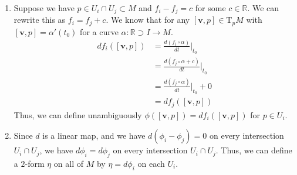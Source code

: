 \documentclass[12 pt, letterpaper]{hmcpset}
\begin{document}
\begin{solution}
	\begin{enumerate}
		\item
			Suppose we have $p \in U_{i} \cap U_{j} \subset M$ and $f_{i} - f_{j} = c$ for some $c \in \mathbb{R}$. We can rewrite this as $f_{i} = f_{j} + c$. We know that for any $[\mathbf{v}, p] \in \mathrm{T}_{p} M$ with $[\mathbf{v}, p] = \alpha'(t_{0})$ for a curve $\alpha : \mathbb{R} \supset I \to M$.
			\[
				\begin{split}
					df_{i}([\mathbf{v}, p]) & = \frac{d (f_{i} \circ \alpha)}{d t} \Big |_{t_{0}} \\
					& = \frac{d (f_{j} \circ \alpha + c)}{d t} \Big |_{t_{0}} \\
					& = \frac{d (f_{j} \circ \alpha)}{d t} \Big |_{t_{0}} + 0 \\
					& = df_{j}([\mathbf{v}, p])
				\end{split}
			\]
			Thus, we can define unambiguously $\phi([\mathbf{v}, p]) = df_{i}([\mathbf{v}, p])$ for $p \in U_{i}$.
		\item
			Since $d$ is a linear map, and we have $d(\phi_{i} - \phi_{j}) = 0$ on every intersection $U_{i} \cap U_{j}$, we have $d \phi_{i} = d \phi_{j}$ on every intersection $U_{i} \cap U_{j}$. Thus, we can define a $2$-form $\eta$ on all of $M$ by $\eta = d \phi_{i}$ on each $U_{i}$.
	\end{enumerate}
\end{solution}
\end{document}
